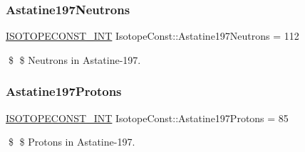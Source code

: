 \subsubsection{\texorpdfstring{Astatine197\+Neutrons}{Astatine197Neutrons}}
{\footnotesize\ttfamily \mbox{\hyperlink{group___isotope_const-_macros_ga5f18360b3e99483a35c32d789e62621c}{I\+S\+O\+T\+O\+P\+E\+C\+O\+N\+S\+T\+\_\+\+I\+NT}} Isotope\+Const\+::\+Astatine197\+Neutrons = 112}

\$ \$ Neutrons in Astatine-\/197. \mbox{\label{group___isotope_const-_astatine-_at197_ga5345da5e54207878925e01589c359e46}} 
\subsubsection{\texorpdfstring{Astatine197\+Protons}{Astatine197Protons}}
{\footnotesize\ttfamily \mbox{\hyperlink{group___isotope_const-_macros_ga5f18360b3e99483a35c32d789e62621c}{I\+S\+O\+T\+O\+P\+E\+C\+O\+N\+S\+T\+\_\+\+I\+NT}} Isotope\+Const\+::\+Astatine197\+Protons = 85}

\$ \$ Protons in Astatine-\/197. 